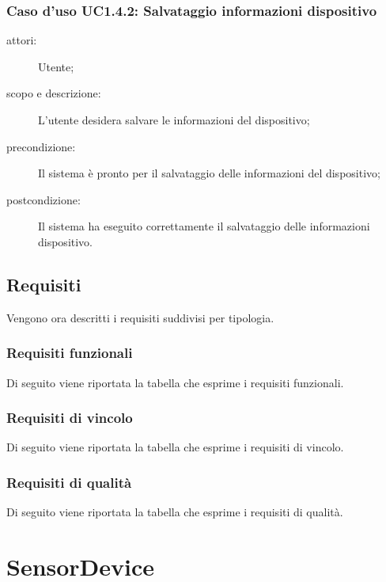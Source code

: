 \subsubsection{Caso d'uso UC1.4.2: Salvataggio informazioni dispositivo}
\begin{description}
\item[attori:] Utente;
\item[scopo e descrizione:] L'utente desidera salvare le informazioni del dispositivo;
\item[precondizione:] Il sistema è pronto per il salvataggio delle informazioni del dispositivo;
\item[postcondizione:] Il sistema ha eseguito correttamente il salvataggio delle informazioni dispositivo.
\end{description}

\subsection{Requisiti}
Vengono ora descritti i requisiti suddivisi per tipologia.

\subsubsection{Requisiti funzionali}
Di seguito viene riportata la tabella che esprime i requisiti funzionali.


\newpage
\subsubsection{Requisiti di vincolo}
Di seguito viene riportata la tabella che esprime i requisiti di vincolo.


%

\subsubsection{Requisiti di qualità}
Di seguito viene riportata la tabella che esprime i requisiti di qualità.


\section{SensorDevice}
